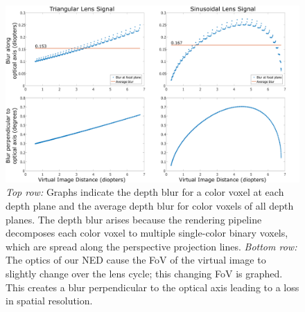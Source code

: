 \begin{figure}[htpb!]
\centering
\includegraphics[width=\columnwidth]{images/volumetric/blur_graphs}
\caption[Volumetric NED: Longitudinal and lateral blur of voxels at each depth plane]{\emph{Top row: }Graphs indicate the depth blur for a color voxel at each depth plane and the average depth blur for color voxels of all depth planes. The depth blur arises because the rendering pipeline decomposes each color voxel to multiple single-color binary voxels, which are spread along the perspective projection lines. \emph{Bottom row: } The optics of our NED cause the FoV of the virtual image to slightly change over the lens cycle; this changing FoV is graphed. This creates a blur perpendicular to the optical axis leading to a loss in spatial resolution.}
\label{fig:volumetric:blur_graphs}
\end{figure}
    
    
